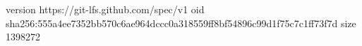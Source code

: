 version https://git-lfs.github.com/spec/v1
oid sha256:555a4ee7352bb570c6ae964dccc0a318559ff8bf54896c99d1f75c7c1ff73f7d
size 1398272
